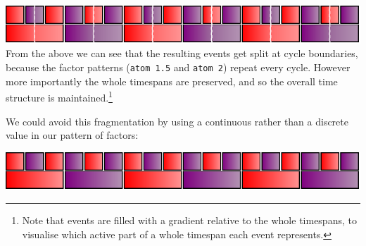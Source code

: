 \begin{Shaded}
\begin{Highlighting}[]
\OtherTok{=}\NormalTok{ stack [fast (atom }
\NormalTok{             ]}
    \OtherTok{=}\NormalTok{ interlace [atom }\NormalTok{]}
\end{Highlighting}
\end{Shaded}

\includegraphics{../figures/fig5.pdf}\\

From the above we can see that the resulting events get split at cycle
boundaries, because the factor patterns (\texttt{atom\ 1.5} and
\texttt{atom\ 2}) repeat every cycle. However more importantly the whole
timespans are preserved, and so the overall time structure is
maintained.\footnote{Note that events are filled with a gradient
  relative to the whole timespans, to visualise which active part of a
  whole timespan each event represents.}

We could avoid this fragmentation by using a continuous rather than a
discrete value in our pattern of factors:

\begin{Shaded}
\begin{Highlighting}[]
\OtherTok{{-}\textgreater{}} 
\OtherTok{=}  \OperatorTok{$}\OtherTok{{-}\textgreater{}}\NormalTok{ [} \NormalTok{ ts v]}

\OtherTok{=}\NormalTok{ stack [fast (hold }
\NormalTok{              ]}
    \OtherTok{=}\NormalTok{ interlace [atom }\NormalTok{]}
\end{Highlighting}
\end{Shaded}

\includegraphics{../figures/fig5b.pdf}\\


